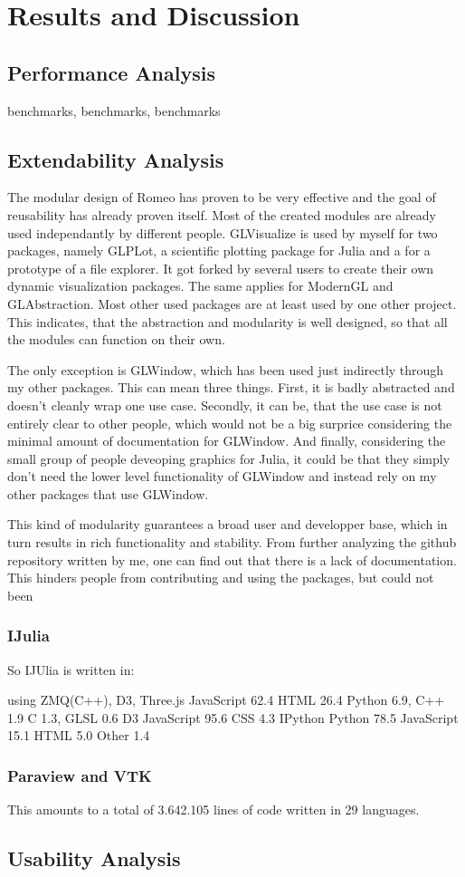 \section{Results and Discussion}
\subsection{Performance Analysis}
benchmarks, benchmarks, benchmarks
\subsection{Extendability Analysis}
The modular design of Romeo has proven to be very effective and the goal of reusability has already proven itself.
Most of the created modules are already used independantly by different people.
GLVisualize is used by myself for two packages, namely GLPLot, a scientific plotting package for Julia and a for a prototype of a file explorer. 
It got forked by several users to create their own dynamic visualization packages.
The same applies for ModernGL and GLAbstraction. Most other used packages are at least used by one other project.
This indicates, that the abstraction and modularity is well designed, so that all the modules can function on their own.

The only exception is GLWindow, which has been used just indirectly through my other packages. 
This can mean three things.
First, it is badly abstracted and doesn't cleanly wrap one use case.
Secondly, it can be, that the use case is not entirely clear to other people, which would not be a big surprice considering the minimal amount of documentation for GLWindow.
And finally, considering the small group of people deveoping graphics for Julia, it could be that they simply don't need the lower level functionality of GLWindow and instead rely on my other packages that use GLWindow.

This kind of modularity guarantees a broad user and developper base, which in turn results in rich functionality and stability.
From further analyzing the github repository written by me, one can find out that there is a lack of documentation.
This hinders people from contributing and using the packages, but could not been 

\subsubsection{IJulia}
So IJUlia is written in:

using ZMQ(C++), D3, 
Three.js
JavaScript 62.4	 HTML 26.4	 Python 6.9,	 C++ 1.9	 C 1.3,	 GLSL 0.6
D3
JavaScript 95.6	 CSS 4.3
IPython
Python 78.5	 JavaScript 15.1	 HTML 5.0	 Other 1.4

\subsubsection{Paraview and VTK}



This amounts to a total of 3.642.105 lines of code written in 29 languages.

\subsection{Usability Analysis}
